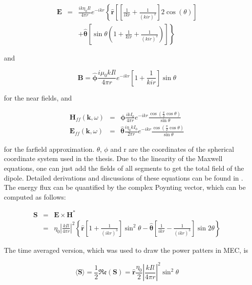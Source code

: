\documentclass[a4paper,11pt]{thesis}
\begin{document}
\begin{eqnarray} \label{get_E_hd}
\mathbf{E}&=&\frac{i k \eta_0 I l}{4 \pi r} e^{-ikr } \left\{ \mathbf{\hat{r} }\left[  \left[  \frac{ 1}{ i k r} +\frac{1}{(kir)^2}\right]   2  \cos (\theta )   \right]\right.\\
&&\left.+\mathbf{ \hat{\theta}} \left[  \sin \theta   \left( 1 + \frac{1}{kir}+  \frac{1}{(kir)^2} \right) \right] \right\}\nonumber
\end{eqnarray}

and

\begin{equation} \label{get_B_hd}
\mathbf{B}= \mathbf{\hat{\phi}} \frac{i \mu_0 k I l}{4 \pi r} e^{-ikr } \left[ 1+ \frac{1}{kir}\right] \sin \theta
\end{equation}

for the near fields, and

\begin{eqnarray}
\mathbf{H}_{ff} (\mathbf{k},\omega)&=&\mathbf{\hat{\phi}}  \frac{ik I_0}{4 \pi r} e^{-ikr} \frac{\cos (\frac{\pi}{2} \cos \theta)}{\sin \theta}\\
\mathbf{E}_{ff} (\mathbf{k},\omega)&=& \mathbf{\hat{\theta}} \frac{i \eta_0 k I_0}{2 \pi r} e^{-ikr} \frac{\cos (\frac{\pi}{2} \cos \theta)}{\sin \theta}
\end{eqnarray}

for the farfield approximation. $\theta$, $\phi$ and r are the coordinates of the spherical coordinate system used in the thesis. Due to the linearity of the Maxwell equations, one can just add the fields of all segments to get the total field of the dipole. Detailed derivations and discussions of these equations can be found in \cite{my_masterthesis}.\\

The energy flux can be quantified by the complex Poynting vector, which can be computed as follows:

\begin{eqnarray} \label{poynting_hd}
\mathbf{S}&=&\mathbf{E} \times \mathbf{H}^* \\
&=& \eta_0 \left| \frac{ k I l}{4 \pi r}\right|^2 \left\{ \mathbf{\hat{r} }\left[ 1 + \frac{1}{(ikr)^3}\right] \sin^2 \theta - \mathbf{\hat{\theta}} \left[ \frac{1}{ikr} - \frac{1}{(ikr)^3}\right] \sin 2\theta \right\} \nonumber
\end{eqnarray}

The time averaged version, which was used to draw the power patters in MEC, is

\begin{equation}\label{time_averaged_energy_flow_hd}
\langle \mathbf{S} \rangle = \frac{1}{2} \mathfrak{Re} (\mathbf{S}) =\mathbf{ \hat{r}} \frac{\eta_0}{2} \left| \frac{ k I l}{4 \pi r}\right|^2 \sin^2 \theta
\end{equation}
\end{document}
